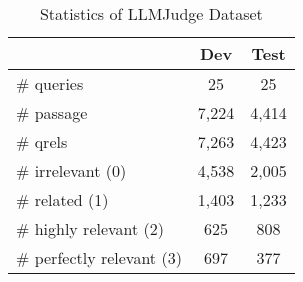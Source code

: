 \begin{table}
    \caption{Statistics of LLMJudge Dataset}
    \label{tbl:llmjudge-dataset}
        \begin{tabular}{lcc}
            \toprule
            \textbf{} & \textbf{Dev} & \textbf{Test} \\
            \midrule
             \# queries  & 25    & 25 \\
             \# passage & 7,224 & 4,414 \\
             \# qrels    & 7,263 & 4,423 \\
             \midrule
             \# irrelevant (0)         & 4,538 & 2,005 \\
             \# related (1)            & 1,403 & 1,233 \\
             \# highly relevant (2)    & 625 & 808 \\
             \# perfectly relevant (3) & 697 & 377 \\
            \bottomrule
        \end{tabular}
\end{table}